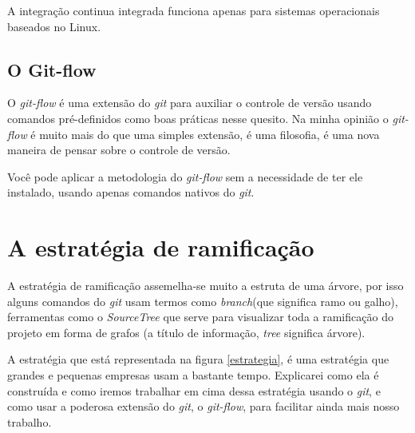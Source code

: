 \documentclass[12pt,openright,oneside,a4paper,english,brazil]{abntex2}
\begin{document}
A integração continua integrada funciona apenas para sistemas operacionais baseados no Linux.

\section{O Git-flow \label{git-flow}}
O \textit{git-flow}  é uma extensão do \textit{git} para auxiliar o controle de versão usando comandos pré-definidos como boas práticas nesse quesito. Na minha opinião o \textit{git-flow}  é muito mais do que uma simples extensão, é uma filosofia, é uma nova maneira de pensar sobre o controle de versão. 

Você pode aplicar a metodologia do \textit{git-flow}  sem a necessidade de ter ele instalado, usando apenas comandos nativos do \textit{git}. 

\chapter{A estratégia de ramificação \label{ramificacao}}
A estratégia de ramificação assemelha-se muito a estruta de uma árvore, por isso alguns comandos do \textit{git} usam termos como \textit{branch}(que significa ramo ou galho), ferramentas como o \textit{SourceTree} que serve para visualizar toda a ramificação do projeto em forma de grafos (a título de informação, \textit{tree} significa árvore).

A estratégia que está representada na figura \ref{estrategia}, é uma estratégia que grandes e pequenas empresas usam a bastante tempo. Explicarei como ela é construída e como iremos trabalhar em cima dessa estratégia usando o \textit{git}, e como usar a poderosa extensão do \textit{git}, o \textit{\textit{git-flow}}, para facilitar ainda mais nosso trabalho. 
\end{document}
